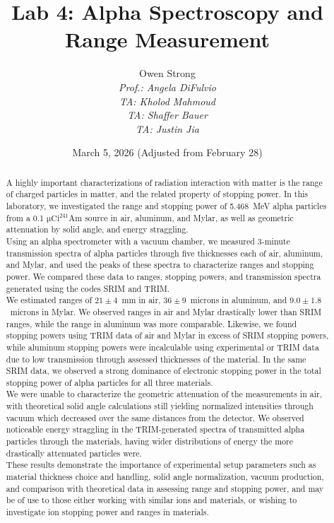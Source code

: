 \documentclass[12pt]{article}
\title{Lab 4: Alpha Spectroscopy and Range Measurement}
\author{Owen Strong \\
\itshape Prof.: Angela DiFulvio\\
\itshape TA: Kholod Mahmoud \\
\itshape TA: Shaffer Bauer \\
\itshape TA: Justin Jia \\
}
\date{March 5, 2026 (Adjusted from February 28)}
\newcommand{\micCi}{\xspace$\mathrm{\mu Ci}$\xspace}
\newcommand{\AmSrc}{\xspace$^{241}$Am\xspace}
\begin{document}
\maketitle
\pagebreak
{\hypersetup{linkcolor=black}\tableofcontents}
\pagebreak
{}
\begin{abstract}
A highly important characterizations of radiation interaction with matter is the range of charged particles in matter, and the related property of stopping power.
In this laboratory, we investigated the range and stopping power of 5.468~MeV alpha particles from a 0.1 \micCi \AmSrc source in air, aluminum, and Mylar, as well as geometric attenuation by solid angle, and energy straggling.\\

Using an alpha spectrometer with a vacuum chamber, we measured 3-minute transmission spectra of alpha particles through five thicknesses each of air, aluminum, and Mylar, and used the peaks of these spectra to characterize ranges and stopping power.
We compared these data to ranges, stopping powers, and transmission spectra generated using the codes SRIM and TRIM.\\

We estimated ranges of $21\pm4$~mm in air, $36\pm9$~microns in aluminum, and $9.0\pm1.8$~microns in Mylar.
We observed ranges in air and Mylar drastically lower than SRIM ranges, while the range in aluminum was more comparable.
Likewise, we found stopping powers using TRIM data of air and Mylar in excess of SRIM stopping powers, while aluminum stopping powers were incalculable using experimental or TRIM data due to low transmission through assessed thicknesses of the material.
In the same SRIM data, we observed a strong dominance of electronic stopping power in the total stopping power of alpha particles for all three materials.\\

We were unable to characterize the geometric attenuation of the measurements in air, with theoretical solid angle calculations still yielding normalized intensities through vacuum which decreased over the same distances from the detector.
We observed noticeable energy straggling in the TRIM-generated spectra of transmitted alpha particles through the materials, having wider distributions of energy the more drastically attenuated particles were.\\

These results demonstrate the importance of experimental setup parameters such as material thickness choice and handling, solid angle normalization, vacuum production, and comparison with theoretical data in assessing range and stopping power, and may be of use to those either working with similar ions and materials, or wishing to investigate ion stopping power and ranges in materials.
\end{abstract}
\end{document}
